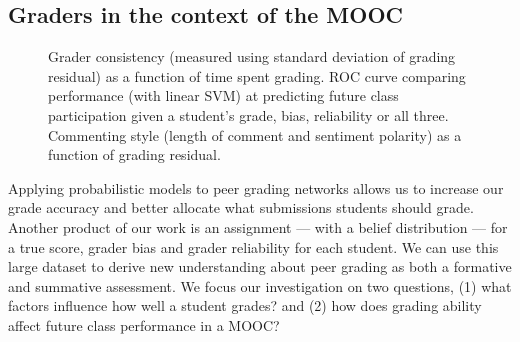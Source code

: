 \subsection{Graders in the context of the MOOC}
\begin{figure}[t!]
\begin{center}
\;\;
\;\;
\end{center}
\caption{
  Grader consistency (measured using standard deviation of grading residual) as
a function of time spent grading.
 ROC curve comparing performance (with linear SVM) at predicting future class participation given
a student's grade, bias, reliability or all three.
 Commenting style (length of comment and sentiment polarity) as a function of grading residual.
}
\end{figure}
Applying probabilistic models to peer grading networks allows us to increase our grade accuracy and better allocate
what submissions students should grade. Another product
of our work is an assignment --- with a belief distribution --- for a true score, grader bias and grader reliability
for each student. We can use this large dataset to derive
new understanding about peer grading as both a formative
and summative assessment. We focus our investigation on
two questions, (1) what factors influence  how well a student
grades? and (2) how does grading ability affect future class
performance in a MOOC?

